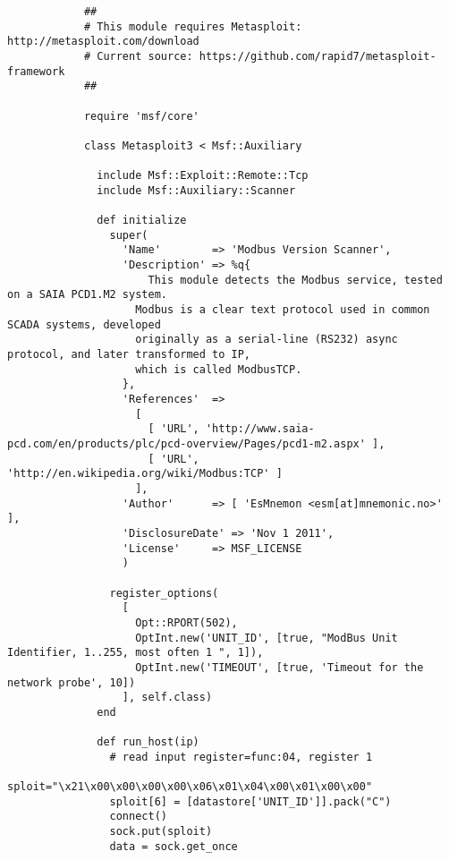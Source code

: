 \documentclass[article,msc=informatik,type=msc,colorback,accentcolor=tud9c]{tudthesis}
\begin{document}
\begin{appendix}
\begin{lstlisting}[caption= Nmap Modbus Discovery Script, label=lst:Nmap Modbus Discovery Script]
  	      	
  	      	
  	      	\end{lstlisting}
  	      	
  	      	\newpage
  	      	
  	      	\begin{lstlisting}[caption=Metasploit Modbus Detect Script,label=lst:Metasploit Modbus Detect Script]
  	      	
  	      	##
  	      	# This module requires Metasploit: http://metasploit.com/download
  	      	# Current source: https://github.com/rapid7/metasploit-framework
  	      	##
  	      	
  	      	require 'msf/core'
  	      	
  	      	class Metasploit3 < Msf::Auxiliary
  	      	
  	      	  include Msf::Exploit::Remote::Tcp
  	      	  include Msf::Auxiliary::Scanner
  	      	
  	      	  def initialize
  	      	    super(
  	      	      'Name'        => 'Modbus Version Scanner',
  	      	      'Description' => %q{
  	      	          This module detects the Modbus service, tested on a SAIA PCD1.M2 system.
  	      	        Modbus is a clear text protocol used in common SCADA systems, developed
  	      	        originally as a serial-line (RS232) async protocol, and later transformed to IP,
  	      	        which is called ModbusTCP.
  	      	      },
  	      	      'References'  =>
  	      	        [
  	      	          [ 'URL', 'http://www.saia-pcd.com/en/products/plc/pcd-overview/Pages/pcd1-m2.aspx' ],
  	      	          [ 'URL', 'http://en.wikipedia.org/wiki/Modbus:TCP' ]
  	      	        ],
  	      	      'Author'      => [ 'EsMnemon <esm[at]mnemonic.no>' ],
  	      	      'DisclosureDate' => 'Nov 1 2011',
  	      	      'License'     => MSF_LICENSE
  	      	      )
  	      	
  	      	    register_options(
  	      	      [
  	      	        Opt::RPORT(502),
  	      	        OptInt.new('UNIT_ID', [true, "ModBus Unit Identifier, 1..255, most often 1 ", 1]),
  	      	        OptInt.new('TIMEOUT', [true, 'Timeout for the network probe', 10])
  	      	      ], self.class)
  	      	  end
  	      	
  	      	  def run_host(ip)
  	      	    # read input register=func:04, register 1
  	      	    sploit="\x21\x00\x00\x00\x00\x06\x01\x04\x00\x01\x00\x00"
  	      	    sploit[6] = [datastore['UNIT_ID']].pack("C")
  	      	    connect()
  	      	    sock.put(sploit)
  	      	    data = sock.get_once
  	      	

\end{lstlisting}
\end{appendix}
\end{document}
